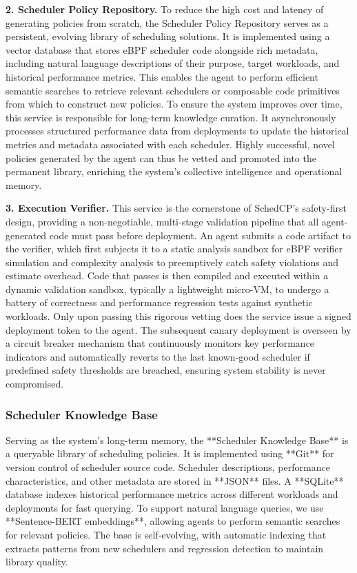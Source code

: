 \textbf{2. Scheduler Policy Repository.} To reduce the high cost and latency of generating policies from scratch, the Scheduler Policy Repository serves as a persistent, evolving library of scheduling solutions. It is implemented using a vector database that stores eBPF scheduler code alongside rich metadata, including natural language descriptions of their purpose, target workloads, and historical performance metrics. This enables the agent to perform efficient semantic searches to retrieve relevant schedulers or composable code primitives from which to construct new policies. To ensure the system improves over time, this service is responsible for long-term knowledge curation. It asynchronously processes structured performance data from deployments to update the historical metrics and metadata associated with each scheduler. Highly successful, novel policies generated by the agent can thus be vetted and promoted into the permanent library, enriching the system's collective intelligence and operational memory.

\textbf{3. Execution Verifier.} This service is the cornerstone of SchedCP's safety-first design, providing a non-negotiable, multi-stage validation pipeline that all agent-generated code must pass before deployment. An agent submits a code artifact to the verifier, which first subjects it to a static analysis sandbox for eBPF verifier simulation and complexity analysis to preemptively catch safety violations and estimate overhead. Code that passes is then compiled and executed within a dynamic validation sandbox, typically a lightweight micro-VM, to undergo a battery of correctness and performance regression tests against synthetic workloads. Only upon passing this rigorous vetting does the service issue a signed deployment token to the agent. The subsequent canary deployment is overseen by a circuit breaker mechanism that continuously monitors key performance indicators and automatically reverts to the last known-good scheduler if predefined safety thresholds are breached, ensuring system stability is never compromised.

\subsubsection{Scheduler Knowledge Base}
Serving as the system's long-term memory, the **Scheduler Knowledge Base** is a queryable library of scheduling policies. It is implemented using **Git** for version control of scheduler source code. Scheduler descriptions, performance characteristics, and other metadata are stored in **JSON** files. A **SQLite** database indexes historical performance metrics across different workloads and deployments for fast querying. To support natural language queries, we use **Sentence-BERT embeddings**, allowing agents to perform semantic searches for relevant policies. The base is self-evolving, with automatic indexing that extracts patterns from new schedulers and regression detection to maintain library quality.

